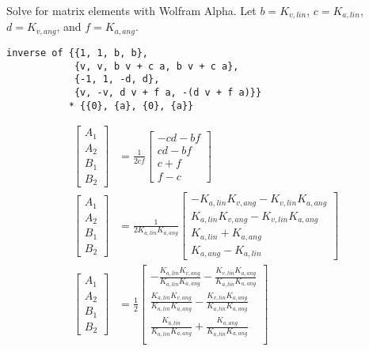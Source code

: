 Solve for matrix elements with Wolfram Alpha. Let
$b = K_{v,lin}$, $c = K_{a,lin}$, $d = K_{v,ang}$, and
$f = K_{a,ang}$.
\begin{verbatim}
inverse of {{1, 1, b, b},
            {v, v, b v + c a, b v + c a},
            {-1, 1, -d, d},
            {v, -v, d v + f a, -(d v + f a)}}
           * {{0}, {a}, {0}, {a}}
\end{verbatim}
\begin{align*}
  \begin{bmatrix}
    A_1 \\
    A_2 \\
    B_1 \\
    B_2
  \end{bmatrix} &= \frac{1}{2cf}
  \begin{bmatrix}
    -cd - bf \\
    cd - bf \\
    c + f \\
    f - c
  \end{bmatrix} \\
  \begin{bmatrix}
    A_1 \\
    A_2 \\
    B_1 \\
    B_2
  \end{bmatrix} &= \frac{1}{2 K_{a,lin} K_{a,ang}}
  \begin{bmatrix}
    -K_{a,lin} K_{v,ang} - K_{v,lin} K_{a,ang} \\
    K_{a,lin} K_{v,ang} - K_{v,lin} K_{a,ang} \\
    K_{a,lin} + K_{a,ang} \\
    K_{a,ang} - K_{a,lin}
  \end{bmatrix} \\
  \begin{bmatrix}
    A_1 \\
    A_2 \\
    B_1 \\
    B_2
  \end{bmatrix} &= \frac{1}{2}
  \begin{bmatrix}
    -\frac{K_{a,lin} K_{v,ang}}{K_{a,lin} K_{a,ang}} -
      \frac{K_{v,lin} K_{a,ang}}{K_{a,lin} K_{a,ang}} \\
    \frac{K_{a,lin} K_{v,ang}}{K_{a,lin} K_{a,ang}} -
      \frac{K_{v,lin} K_{a,ang}}{K_{a,lin} K_{a,ang}} \\
    \frac{K_{a,lin}}{K_{a,lin} K_{a,ang}} +
      \frac{K_{a,ang}}{K_{a,lin} K_{a,ang}} \\

\end{bmatrix}
\end{align*}
